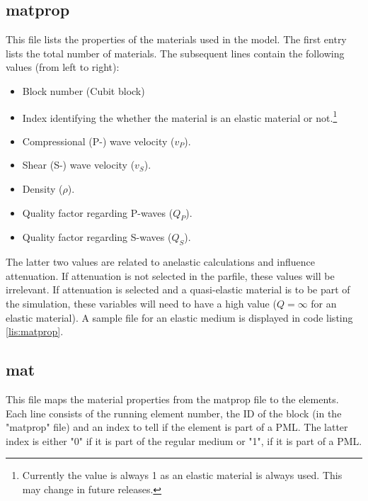     	\subsection{matprop}
    	\label{subsec:matprop}
    		
    		This file lists the properties of the materials used in the model. The first entry lists the total number of materials. The subsequent lines contain the following values (from left to right):
    		\begin{itemize}
    			\item Block number (Cubit block)
    			\item Index identifying the whether the material is an elastic material or not.\footnote{Currently the value is always 1 as an elastic material is always used. This may change in future releases.}
    			\item Compressional (P-) wave velocity ($v_P$).
    			\item Shear (S-) wave velocity ($v_S$).
    			\item Density ($\rho$).
    			\item Quality factor regarding P-waves ($Q_P$).
    			\item Quality factor regarding S-waves ($Q_S$). 
    		\end{itemize}
    		The latter two values are related to anelastic calculations and influence attenuation. If attenuation is not selected in the parfile, these values will be irrelevant. If attenuation is selected and a quasi-elastic material is to be part of the simulation, these variables will need to have a high value ($Q = \infty$ for an elastic material). A sample file for an elastic medium is displayed in code listing \ref{lis:matprop}. \\

    	\subsection{mat}
    	\label{subsec:mat}
    		
    		This file maps the material properties from the matprop file to the elements. Each line consists of the running element number, the ID of the block (in the "matprop" file) and an index to tell if the element is part of a PML. The latter index is either "0" if it is part of the regular medium or "1", if it is part of a PML. 
